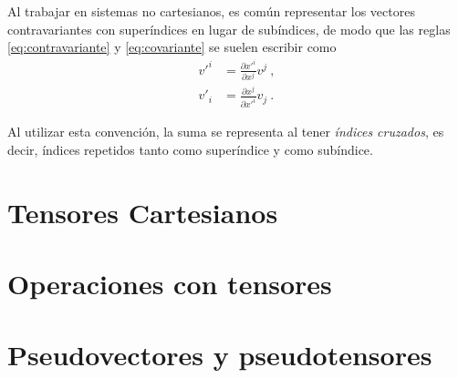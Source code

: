 Al trabajar en sistemas no cartesianos, es común representar los vectores contravariantes con superíndices en lugar de subíndices, de modo que las reglas \eqref{eq:contravariante} y \eqref{eq:covariante} se suelen escribir como
\begin{align*}
    v'^i & = \frac{\partial x'^{i}}{\partial x^j} v^j \ , \\
    v'_i & = \frac{\partial x^j}{\partial x'^{i}} v_j \ .
\end{align*}

Al utilizar esta convención, la suma se representa al tener \emph{índices cruzados}, es decir, índices repetidos tanto como superíndice y como subíndice.

\section{Tensores Cartesianos}

\section{Operaciones con tensores}

\section{Pseudovectores y pseudotensores}


